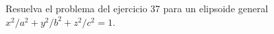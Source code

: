 \item Resuelva el problema del ejercicio 37 para un elipsoide general $x^2/a^2 + y^2/b^2 + z^2/c^2 = 1$.

